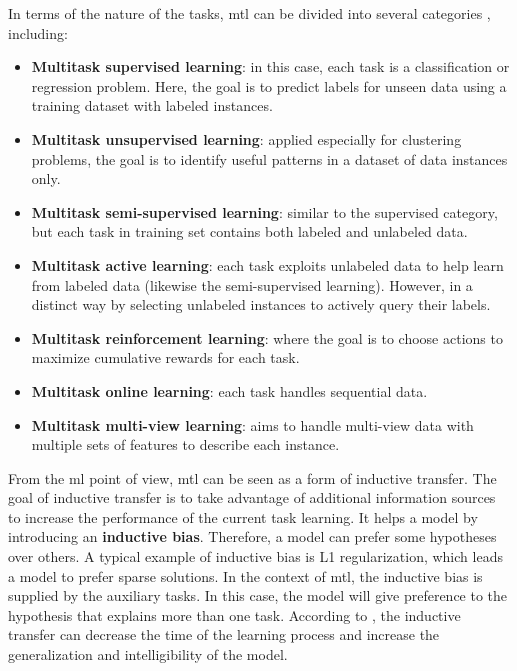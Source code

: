 In terms of the nature of the tasks, \acl{mtl} can be divided into several categories \citep{zhang2018overview}, including:

\begin{itemize}
\item \textbf{Multitask supervised learning}: in this case, each task is a classification or regression problem. Here, the goal is to predict labels for unseen data using a training dataset with labeled instances.

\item \textbf{Multitask unsupervised learning}: applied especially for clustering problems, the goal is to identify useful patterns in a dataset of data instances only.

\item \textbf{Multitask semi-supervised learning}: similar to the supervised category, but each task in training set contains both  labeled and unlabeled data.

\item \textbf{Multitask active learning}: each task exploits unlabeled data to help learn from labeled data (likewise the semi-supervised learning). However, in a distinct way by selecting unlabeled instances to actively query their labels.

\item \textbf{Multitask reinforcement learning}: where the goal is to choose actions to maximize cumulative rewards for each task.

\item \textbf{Multitask online learning}: each task handles sequential data.

\item \textbf{Multitask multi-view learning}: aims to handle multi-view data with multiple sets of features to describe each instance.
\end{itemize}

From the \acl{ml} point of view, \acl{mtl} can be seen as a form of inductive transfer. The goal of inductive transfer is to take advantage of additional information sources to increase the performance of the current task learning. It helps a model by introducing an \textbf{inductive bias}. Therefore, a model can prefer some hypotheses over others. A typical example of inductive bias is L1 regularization, which leads a model to prefer sparse solutions. In the context of \acs{mtl}, the inductive bias is supplied by the auxiliary tasks. In this case, the model will give preference to the hypothesis that explains more than one task. According to \cite{Caruana1997}, the inductive transfer can decrease the time of the learning process and increase the generalization and intelligibility of the model. 

